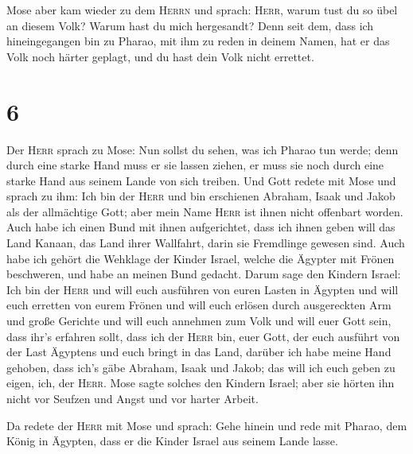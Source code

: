  Mose aber kam wieder zu dem \textsc{Herrn} und sprach:
\textsc{Herr}, warum tust du so übel an diesem Volk? Warum hast du mich
hergesandt?  Denn seit dem, dass ich hineingegangen bin
zu Pharao, mit ihm zu reden in deinem Namen, hat er das Volk noch härter
geplagt, und du hast dein Volk nicht errettet.

\hypertarget{section-5}{%
\section{6}\label{section-5}}

 Der \textsc{Herr} sprach zu Mose: Nun sollst du sehen,
was ich Pharao tun werde; denn durch eine starke Hand muss er sie lassen
ziehen, er muss sie noch durch eine starke Hand aus seinem Lande von
sich treiben.  Und Gott redete mit Mose und sprach zu ihm:
Ich bin der \textsc{Herr}  und bin erschienen Abraham,
Isaak und Jakob als der allmächtige Gott; aber mein Name \textsc{Herr}
ist ihnen nicht offenbart worden.  Auch habe ich einen
Bund mit ihnen aufgerichtet, dass ich ihnen geben will das Land Kanaan,
das Land ihrer Wallfahrt, darin sie Fremdlinge gewesen sind.
 Auch habe ich gehört die Wehklage der Kinder Israel,
welche die Ägypter mit Frönen beschweren, und habe an meinen Bund
gedacht.  Darum sage den Kindern Israel: Ich bin der
\textsc{Herr} und will euch ausführen von euren Lasten in Ägypten und
will euch erretten von eurem Frönen und will euch erlösen durch
ausgereckten Arm und große Gerichte  und will euch
annehmen zum Volk und will euer Gott sein, dass ihr's erfahren sollt,
dass ich der \textsc{Herr} bin, euer Gott, der euch ausführt von der
Last Ägyptens  und euch bringt in das Land, darüber ich
habe meine Hand gehoben, dass ich's gäbe Abraham, Isaak und Jakob; das
will ich euch geben zu eigen, ich, der \textsc{Herr}. 
Mose sagte solches den Kindern Israel; aber sie hörten ihn nicht vor
Seufzen und Angst und vor harter Arbeit.

 Da redete der \textsc{Herr} mit Mose und sprach:
 Gehe hinein und rede mit Pharao, dem König in Ägypten,
dass er die Kinder Israel aus seinem Lande lasse.

